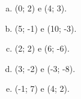 \documentclass[a4paper,14pt]{article}
\begin{document}
\begin{multicols}{2}
\begin{enumerate}
\begin{enumerate}[a)]
        		\item (0; 2) e (4; 3).
        		\item (5; -1) e (10; -3).
        		\item (2; 2) e (6; -6).
        		\item (3; -2) e (-3; -8).
        		\item (-1; 7) e (4; 2).
        	\end{enumerate}
        \end{enumerate}
    $~$ \\ $~$ \\ $~$ \\ $~$ \\ $~$ \\ $~$ \\ $~$ \\ $~$ \\ $~$ \\ $~$ \\ $~$ \\ $~$ \\ $~$ \\ $~$ \\ $~$ \\ $~$ \\ $~$ \\ $~$ \\ $~$ \\ $~$ \\
    \end{multicols}
\end{document}
